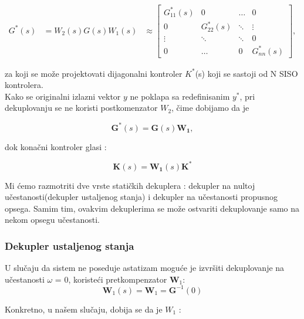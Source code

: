 \documentclass[a4paper,11pt]{article}
\theoremstyle{definition} \newtheorem{deff}{Definicija}[section]
\theoremstyle{definition} \newtheorem{prim}[deff]{Primer}
\theoremstyle{plain} \newtheorem{teor}[deff]{Teorema}
\begin{document}
	\begin{equation}
		\begin{aligned}
			G^*(s) &= W_2(s) G(s) W_1(s) 
			&\approx
			\begin{bmatrix}
				G_{11}^*(s) & 0 & \dots & 0 \\
				0 & G_{22}^*(s) & \ddots & \vdots \\
				\vdots & \ddots & \ddots & 0 \\
				0 & \dots & 0 & G_{nn}^*(s)
			\end{bmatrix} ,
		\end{aligned}
		\label{eq:dijag}
	\end{equation}
	
	za koji se može projektovati dijagonalni kontroler $K^*$(s) koji se sastoji od N SISO kontrolera. \\
	
	Kako se originalni izlazni vektor $y$ ne poklapa sa redefinisanim $y^*$, pri dekuplovanju se ne koristi postkomenzator $W_2$, čime dobijamo da je 
	
	\begin{equation}
		\mathbf{G}^*(s) = \mathbf{G}(s) \mathbf{W_1},
	\end{equation}
	
	\noindent dok konačni kontroler glasi :
	
	\begin{equation}
		\mathbf{K}(s) = \mathbf{W_1}(s) \mathbf{K}^{*}
	\end{equation}
	
	\noindent Mi ćemo razmotriti dve vrste statičkih dekuplera : dekupler na nultoj učestanosti(dekupler ustaljenog stanja) i dekupler na učestanosti propusnog opsega. Samim tim, ovakvim dekuplerima se može ostvariti dekuplovanje samo na nekom opsegu učestanosti. 
	
	
	\newpage
	\subsubsection{Dekupler ustaljenog stanja}
	
	U slučaju da sistem ne poseduje astatizam moguće je izvršiti dekuplovanje na učestanosti $\omega$ = 0, koristeći pretkompenzator $\textbf{W}_1$:
	\begin{equation}
		\textbf{W}_1(s) = \textbf{W}_1 = \textbf{G}^{-1}(0)
	\end{equation}
	
	\vspace{1cm}
	Konkretno, u našem slučaju, dobija se da je $W_1$ : 
	
\end{document}

